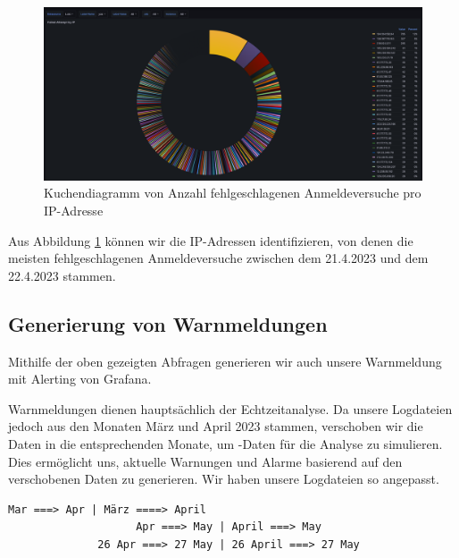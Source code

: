 \newpage
{}
\thispagestyle{lscape}
\begin{landscape}
    \begin{figure}[H]
        \centerline{\includegraphics[width=1.6\textwidth]{assets/Failed_pro_ip.png}}
        \caption[Kuchendiagramm von Anzahl fehlgeschlagenen Anmeldeversuche pro IP-Adresse]
        {Kuchendiagramm von Anzahl fehlgeschlagenen Anmeldeversuche pro IP-Adresse}
        \label{fig:1_Anmeldung_IPAdresse}
        \centering
    \end{figure}

Aus Abbildung \ref{fig:1_Anmeldung_IPAdresse} können wir die IP-Adressen identifizieren, von denen die meisten fehlgeschlagenen Anmeldeversuche zwischen dem 21.4.2023 und dem 22.4.2023 stammen.
\end{landscape}
\restoregeometry



\subsection{Generierung von Warnmeldungen}

Mithilfe der oben gezeigten Abfragen generieren wir auch unsere Warnmeldung mit Alerting von Grafana.

Warnmeldungen dienen hauptsächlich der Echtzeitanalyse. Da unsere Logdateien jedoch aus den Monaten März und April 2023 stammen, verschoben wir die Daten in die entsprechenden Monate, um -Daten für die Analyse zu simulieren. Dies ermöglicht uns, aktuelle Warnungen und Alarme basierend auf den verschobenen Daten zu generieren. Wir haben unsere Logdateien so angepasst.

\begin{center}
{
\begin{Verbatim}[frame=single]
                    Mar ===> Apr | März ====> April
                    Apr ===> May | April ===> May
              26 Apr ===> 27 May | 26 April ===> 27 May
\end{Verbatim}
}
\end{center}

